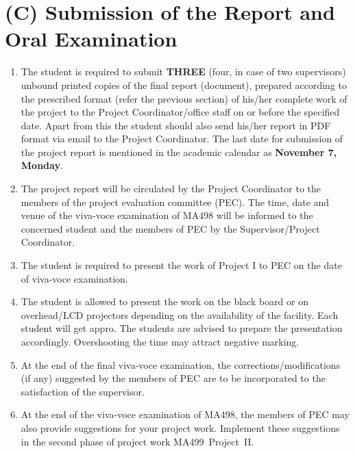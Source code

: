 \documentclass[12pt, a4paper]{article}
\begin{document}
\section*{(C) Submission of the Report and Oral Examination}
\begin{enumerate}
\item{The student is required to submit {\bf THREE} (four, in case of two supervisors) unbound printed copies of the final
     report (document), prepared according to the prescribed format (refer the
     previous section) of his/her complete work of the project to the Project
     Coordinator/office staff on or before the specified date. Apart from this the student
     should also send his/her report in PDF format via email to the Project
     Coordinator. The last date for submission of the project report is
     mentioned in the academic calendar as {\bf November 7, Monday}.}

\item{The project report will be circulated by the Project Coordinator  to the members of the project
     evaluation committee (PEC).
     The  time, date and venue of the viva-voce examination
     of MA498 will be informed to
     the concerned student and  the members of PEC by the Supervisor/Project Coordinator. }

\item{The student is required to present the work of Project I  to PEC on the
     date of viva-voce examination.}

\item{The student is allowed to present the  work on the
     black board or on overhead/LCD projectors depending on the availability
     of the facility. Each student will get appro. The students are advised to prepare the presentation
     accordingly. Overshooting the time may attract negative marking.
}


\item{At the end of the final viva-voce examination, the
     corrections/modifications (if any) suggested by the
     members of PEC are to be incorporated
     to the satisfaction of the supervisor. }
\item{At the end of the viva-voce examination of MA498,
     the members of PEC may also provide suggestions for your project work.
     Implement these suggestions
     in the second phase of project work MA499~Project~II. }

\end{enumerate}
\end{document}
